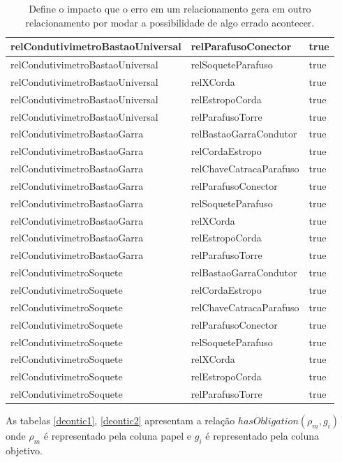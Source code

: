 \documentclass[12pt]{article}
\begin{document}
\begin{table}[H]
\begin{tabular}{|l|l|l|}
relCondutivimetroBastaoUniversal & relParafusoConector & true \\ \hline
relCondutivimetroBastaoUniversal & relSoqueteParafuso & true \\ \hline
relCondutivimetroBastaoUniversal & relXCorda & true \\ \hline
relCondutivimetroBastaoUniversal & relEstropoCorda & true \\ \hline
relCondutivimetroBastaoUniversal & relParafusoTorre & true \\ \hline
relCondutivimetroBastaoGarra & relBastaoGarraCondutor & true \\ \hline
relCondutivimetroBastaoGarra & relCordaEstropo & true \\ \hline
relCondutivimetroBastaoGarra & relChaveCatracaParafuso & true \\ \hline
relCondutivimetroBastaoGarra & relParafusoConector & true \\ \hline
relCondutivimetroBastaoGarra & relSoqueteParafuso & true \\ \hline
relCondutivimetroBastaoGarra & relXCorda & true \\ \hline
relCondutivimetroBastaoGarra & relEstropoCorda & true \\ \hline
relCondutivimetroBastaoGarra & relParafusoTorre & true \\ \hline
relCondutivimetroSoquete & relBastaoGarraCondutor & true \\ \hline
relCondutivimetroSoquete & relCordaEstropo & true \\ \hline
relCondutivimetroSoquete & relChaveCatracaParafuso & true \\ \hline
relCondutivimetroSoquete & relParafusoConector & true \\ \hline
relCondutivimetroSoquete & relSoqueteParafuso & true \\ \hline
relCondutivimetroSoquete & relXCorda & true \\ \hline
relCondutivimetroSoquete & relEstropoCorda & true \\ \hline
relCondutivimetroSoquete & relParafusoTorre & true \\ \hline
\end{tabular}
\caption{Define o impacto que o erro em um relacionamento gera em outro relacionamento por modar a possibilidade de algo errado acontecer.}
\label{relation2}
\end{table}

As tabelas \ref{deontic1}, \ref{deontic2} apresentam a relação $hasObligation(\rho_m,g_i)$ onde $\rho_m$ é representado pela coluna papel e $g_i$ é representado pela coluna objetivo. 
\end{document}

